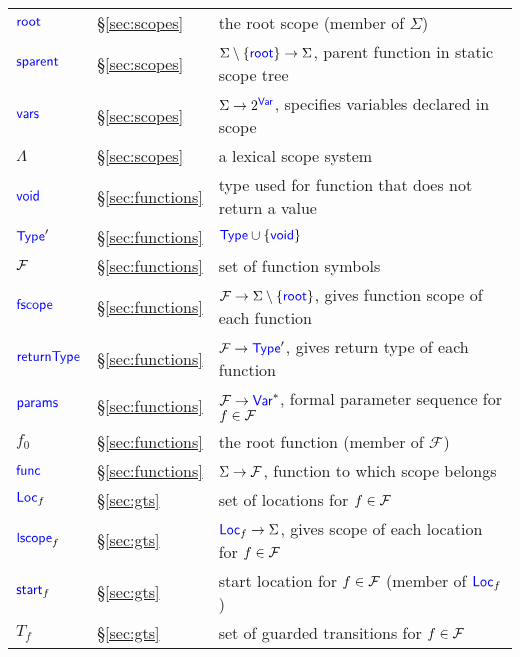 {\begin{tabular}{lll}
    $\textsf{\textcolor{blue}{\textup{root}}}$ & \S\ref{sec:scopes} & the root scope (member of $\Sigma$)\\
    $\textsf{\textcolor{blue}{\textup{sparent}}}$ & \S\ref{sec:scopes} & $\Sigma\setminus\{\textsf{\textcolor{blue}{\textup{root}}}\}\rightarrow\Sigma$, parent function in static scope tree\\
    $\textsf{\textcolor{blue}{\textup{vars}}}$ & \S\ref{sec:scopes} & $\Sigma\rightarrow 2^{\textsf{\textcolor{blue}{\textup{Var}}}}$, specifies variables declared in scope\\
    $\Lambda$ & \S\ref{sec:scopes} & a lexical scope system\\
    $\textsf{\textcolor{blue}{\textup{void}}}$ & \S\ref{sec:functions} & type used for function that does not return  a value\\
    $\textsf{\textcolor{blue}{\textup{Type}}}'$ & \S\ref{sec:functions} & $\textsf{\textcolor{blue}{\textup{Type}}}\cup\{\textsf{\textcolor{blue}{\textup{void}}}\}$\\
    $\mathcal{F}$ & \S\ref{sec:functions} & set of function symbols\\
    $\textsf{\textcolor{blue}{\textup{fscope}}}$ & \S\ref{sec:functions} & $\mathcal{F}\rightarrow\Sigma\setminus\{\textsf{\textcolor{blue}{\textup{root}}}\}$, gives function scope of each function\\
    $\textsf{\textcolor{blue}{\textup{returnType}}}$ & \S\ref{sec:functions} & $\mathcal{F}\rightarrow\textsf{\textcolor{blue}{\textup{Type}}}'$, gives return type of each function\\
    $\textsf{\textcolor{blue}{\textup{params}}}$ & \S\ref{sec:functions} & $\mathcal{F}\rightarrow\textsf{\textcolor{blue}{\textup{Var}}}^*$, formal
    parameter sequence for $f\in\mathcal{F}$\\
    $f_0$ & \S\ref{sec:functions} & the root function (member of
    $\mathcal{F}$)\\
    $\textsf{\textcolor{blue}{\textup{func}}}$ & \S\ref{sec:functions} & $\Sigma\rightarrow\mathcal{F}$, function to
    which scope belongs\\
    $\textsf{\textcolor{blue}{\textup{Loc}}}_f$ & \S\ref{sec:gts} & set of locations for $f\in\mathcal{F}$\\
    $\textsf{\textcolor{blue}{\textup{lscope}}}_f$ & \S\ref{sec:gts} & $\textsf{\textcolor{blue}{\textup{Loc}}}_f\rightarrow\Sigma$, gives scope of each location for $f\in\mathcal{F}$\\
    $\textsf{\textcolor{blue}{\textup{start}}}_f$ & \S\ref{sec:gts} & start location for $f\in\mathcal{F}$ (member of $\textsf{\textcolor{blue}{\textup{Loc}}}_f$)\\
    $T_f$ & \S\ref{sec:gts} & set of guarded transitions for $f\in\mathcal{F}$\\
  \end{tabular}
}



\newcommand{\cckey}{\$}
\newcommand{\cc}[1]{\mbox{\texttt{\cckey{}#1}}}
\newcommand{\cproc}{\cc{proc}}
\newcommand{\cself}{\cc{self}}
\newcommand{\cinput}{\cc{input}}
\newcommand{\coutput}{\cc{output}}
\newcommand{\cspawn}{\cc{spawn}}
\newcommand{\cwait}{\cc{wait}}
\newcommand{\cassert}{\cc{assert}}
\newcommand{\ctrue}{\cc{true}}
\newcommand{\cfalse}{\cc{false}}
\newcommand{\cassume}{\cc{assume}}
\newcommand{\catom}{\cc{atom}}
\newcommand{\catomic}{\cc{atomic}}
\newcommand{\cwhen}{\cc{when}}
\newcommand{\cchoose}{\cc{choose}}
\newcommand{\cchooseint}{\cc{choose{\U}int}}
\newcommand{\cinvariant}{\cc{invariant}}
\newcommand{\crequires}{\cc{requires}}
\newcommand{\censures}{\cc{ensures}}
\newcommand{\cexit}{\cc{exit}}
\newcommand{\cresult}{\cc{result}}
\newcommand{\cat}{\texttt{@}}
\newcommand{\ccollective}{\cc{collective}}

\newcommand{\cheap}{\cc{heap}}
\newcommand{\cscope}{\cc{scope}}
\newcommand{\cregion}{\cc{region}}
\newcommand{\cmalloc}{\cc{malloc}}

\newcommand{\cbundle}{\cc{bundle}}
\newcommand{\cmessage}{\cc{message}}
\newcommand{\ccomm}{\cc{comm}}
\newcommand{\cgcomm}{\cc{gcomm}}


